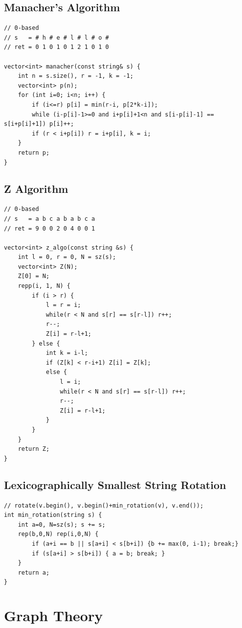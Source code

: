 \documentclass[landscape, 8pt, a4paper, oneside, twocolumn]{extarticle}
\begin{document}
\subsection{Manacher's Algorithm}
\begin{verbatim}
// 0-based
// s   = # h # e # l # l # o #
// ret = 0 1 0 1 0 1 2 1 0 1 0

vector<int> manacher(const string& s) {
    int n = s.size(), r = -1, k = -1;
    vector<int> p(n);
    for (int i=0; i<n; i++) {
        if (i<=r) p[i] = min(r-i, p[2*k-i]);
        while (i-p[i]-1>=0 and i+p[i]+1<n and s[i-p[i]-1] == s[i+p[i]+1]) p[i]++;
        if (r < i+p[i]) r = i+p[i], k = i;
    }
    return p;
}
\end{verbatim}

\subsection{Z Algorithm}
\begin{verbatim}
// 0-based
// s   = a b c a b a b c a
// ret = 9 0 0 2 0 4 0 0 1 

vector<int> z_algo(const string &s) {
    int l = 0, r = 0, N = sz(s);
    vector<int> Z(N);
    Z[0] = N;
    repp(i, 1, N) {
        if (i > r) {
            l = r = i;
            while(r < N and s[r] == s[r-l]) r++;
            r--;
            Z[i] = r-l+1;
        } else {
            int k = i-l;
            if (Z[k] < r-i+1) Z[i] = Z[k];
            else {
                l = i;
                while(r < N and s[r] == s[r-l]) r++;
                r--;
                Z[i] = r-l+1;
            }
        }
    }
    return Z;
}
\end{verbatim}

\subsection{Lexicographically Smallest String Rotation}
\begin{verbatim}
// rotate(v.begin(), v.begin()+min_rotation(v), v.end());
int min_rotation(string s) {
	int a=0, N=sz(s); s += s;
	rep(b,0,N) rep(i,0,N) {
		if (a+i == b || s[a+i] < s[b+i]) {b += max(0, i-1); break;}
		if (s[a+i] > s[b+i]) { a = b; break; }
	}
	return a;
}
\end{verbatim}

\section{Graph Theory}
\end{document}
